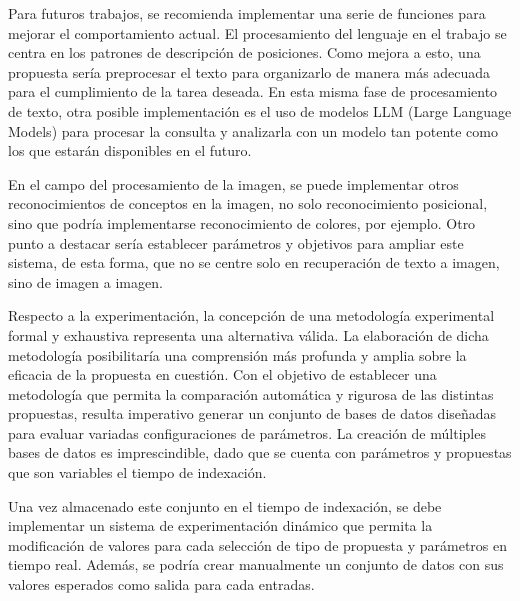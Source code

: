 \begin{recomendations}
    Para futuros trabajos, se recomienda implementar una serie de funciones para mejorar el comportamiento actual. El procesamiento del lenguaje en el trabajo se centra en los patrones de descripción de posiciones. Como mejora a esto, una propuesta sería preprocesar el texto para organizarlo de manera más adecuada para el cumplimiento de la tarea deseada. En esta misma fase de procesamiento de texto, otra posible implementación es el uso de modelos LLM (Large Language Models) para procesar la consulta y analizarla con un modelo tan potente como los que estarán disponibles en el futuro.
    
    En el campo del procesamiento de la imagen, se puede implementar otros reconocimientos de conceptos en la imagen, no solo reconocimiento posicional, sino que podría implementarse reconocimiento de colores, por ejemplo. Otro punto a destacar sería establecer parámetros y objetivos para ampliar este sistema, de esta forma, que no se centre solo en recuperación de texto a imagen, sino de imagen a imagen.
        
    Respecto a la experimentación, la concepción de una metodología experimental formal y exhaustiva representa una alternativa v\'alida. La elaboración de dicha metodología posibilitaría una comprensión más profunda y amplia sobre la eficacia de la propuesta en cuestión. Con el objetivo de establecer una metodología que permita la comparación automática y rigurosa de las distintas propuestas, resulta imperativo generar un conjunto de bases de datos diseñadas para evaluar variadas configuraciones de parámetros. La creación de múltiples bases de datos es imprescindible, dado que se cuenta con parámetros y propuestas que son variables el tiempo de indexación.

    Una vez almacenado este conjunto en el tiempo de indexación, se debe implementar un sistema de experimentación dinámico que permita la modificación de valores para cada selección de tipo de propuesta y parámetros en tiempo real. Además, se podría crear manualmente un conjunto de datos con sus valores esperados como salida para cada entradas.

\end{recomendations}
    